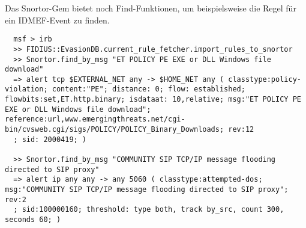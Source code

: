 Das Snortor-Gem bietet noch Find-Funktionen, um beispielsweise die
Regel für ein IDMEF-Event zu finden.

\begin{lstlisting}
  msf > irb
  >> FIDIUS::EvasionDB.current_rule_fetcher.import_rules_to_snortor
  >> Snortor.find_by_msg "ET POLICY PE EXE or DLL Windows file download"
  => alert tcp $EXTERNAL_NET any -> $HOME_NET any ( classtype:policy-violation; content:"PE"; distance: 0; flow: established; flowbits:set,ET.http.binary; isdataat: 10,relative; msg:"ET POLICY PE EXE or DLL Windows file download"; reference:url,www.emergingthreats.net/cgi-bin/cvsweb.cgi/sigs/POLICY/POLICY_Binary_Downloads; rev:12
  ; sid: 2000419; )

  >> Snortor.find_by_msg "COMMUNITY SIP TCP/IP message flooding directed to SIP proxy"
  => alert ip any any -> any 5060 ( classtype:attempted-dos; msg:"COMMUNITY SIP TCP/IP message flooding directed to SIP proxy"; rev:2
  ; sid:100000160; threshold: type both, track by_src, count 300, seconds 60; )

\end{lstlisting}
